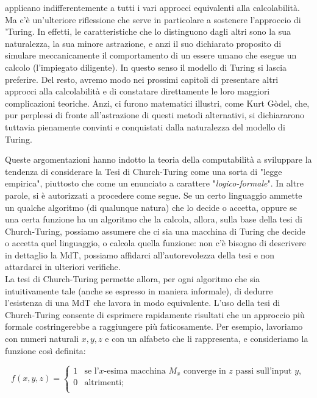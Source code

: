 \begin{enumerate}
          applicano indifferentemente a tutti i vari approcci equivalenti alla
          calcolabilità. Ma c'è un'ulteriore riflessione che serve in particolare a
          sostenere l'approccio di 'Turing. In effetti, le caratteristiche che lo
          distinguono dagli altri sono la sua naturalezza, la sua minore astrazione,
          e anzi il suo dichiarato proposito di simulare meccanicamente il
          comportamento di un essere umano che esegue un calcolo (l'impiegato
          diligente). In questo senso il modello di Turing si lascia preferire. Del
          resto, avremo modo nei prossimi capitoli di presentare altri approcci alla
          calcolabilità e di constatare direttamente le loro maggiori complicazioni
          teoriche. Anzi, ci furono matematici illustri, come Kurt Gòdel, che, pur
          perplessi di fronte all'astrazione di questi metodi alternativi, si
          dichiararono tuttavia pienamente convinti e conquistati dalla naturalezza
          del modello di Turing.
\end{enumerate}

Queste argomentazioni hanno indotto la teoria della computabilità a sviluppare la
tendenza di considerare la Tesi di Church-Turing come una sorta di "legge empirica",
piuttosto che come un enunciato a carattere "\textit{logico-formale}". In altre
parole, si è autorizzati a procedere come segue. Se un certo linguaggio ammette un
qualche algoritmo (di qualunque natura) che lo decide o accetta, oppure se una certa
funzione ha un algoritmo che la calcola, allora, sulla base della tesi di
Church-Turing, possiamo assumere che ci sia una macchina di Turing che decide o
accetta quel linguaggio, o calcola quella funzione: non c'è bisogno di descrivere in
dettaglio la MdT, possiamo affidarci all'autorevolezza della tesi e non attardarci in
ulteriori verifiche.\\
La tesi di Church-Turing permette allora, per
ogni algoritmo che sia intuitivamente tale (anche se espresso in maniera informale),
di dedurre l'esistenza di una MdT che lavora in modo equivalente. L'uso della tesi di
Church-Turing consente di esprimere rapidamente risultati che un approccio più
formale costringerebbe a raggiungere più faticosamente. Per esempio, lavoriamo con
numeri naturali $x, y, z$ e con un alfabeto che li rappresenta, e consideriamo la
funzione così definita:

\[
    f(x, y, z) =  \begin{cases}
        1 & \textrm{se l'}x\textrm{-esima macchina } M_x \textrm{ converge in } z \textrm{ passi sull'input } y, \\
        0 & \textrm{altrimenti;}                                                                                 \\
    \end{cases}
\]

